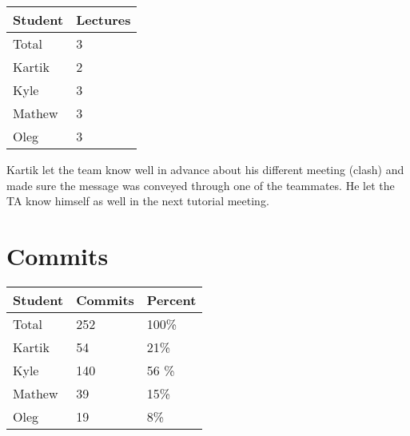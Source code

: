 \documentclass{article}
\begin{document}

\begin{table}[H]
\centering
\begin{tabular}{ll}
\toprule
\textbf{Student} & \textbf{Lectures}\\
\midrule
Total & 3\\
Kartik & 2\\
Kyle   & 3\\
Mathew & 3\\
Oleg   & 3\\
\bottomrule
\end{tabular}
\end{table}

Kartik let the team know well in advance about his different meeting (clash) and made sure the message was conveyed through one of the teammates. He let the TA know himself as well in the next tutorial meeting.

\section{Commits}


\begin{table}[H]
\centering
\begin{tabular}{lll}
\toprule
\textbf{Student} & \textbf{Commits} & \textbf{Percent}\\
\midrule
Total & 252 & 100\% \\
Kartik & 54 & 21\%\\
Kyle   & 140 & 56 \%\\
Mathew & 39 &15\% \\
Oleg   & 19 &8\% \\
\bottomrule
\end{tabular}
\end{table}
\end{document}
